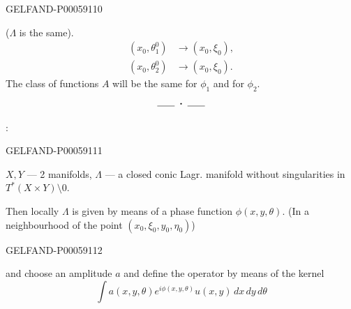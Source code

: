 \begin{GelfandAdjacentEvidence}{GELFAND-P000591}{10}

(\(\Lambda\) is the same).
\[
\begin{aligned}
(x_0,\theta_1^0)&\longrightarrow(x_0,\xi_0),\\
(x_0,\theta_2^0)&\longrightarrow(x_0,\xi_0).
\end{aligned}
\]
The class of functions \(A\) will be the same for \(\phi_1\) and for \(\phi_2\).
\[
\rule{1.8em}{.4pt}\;\boldsymbol{\cdot}\;\rule{1.8em}{.4pt}
\]

:
\end{GelfandAdjacentEvidence}
\begin{GelfandAdjacentEvidence}{GELFAND-P000591}{11}

\(X,Y\) — 2 manifolds, \(\Lambda\) — a closed conic Lagr. manifold without singularities
in \(T^*(X\times Y)\setminus0\).

Then locally \(\Lambda\) is given by means of a phase function
\(\phi(x,y,\theta)\).
(In a neighbourhood of the point \((x_0,\xi_0,y_0,\eta_0)\))
\end{GelfandAdjacentEvidence}
\begin{GelfandAdjacentEvidence}{GELFAND-P000591}{12}

and choose an amplitude \(a\) and define the operator by means of the kernel
\[
\int a(x,y,\theta)e^{i\phi(x,y,\theta)}u(x,y)\,dx\,dy\,d\theta
\]
\end{GelfandAdjacentEvidence}



